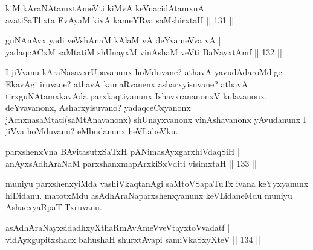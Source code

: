 \begin{shl}
\footnotemark{}kiM kAraNAtamxtAmeVti \footnotemark{}kiMvA keVnacidAtamxnA |\\
avatiSaThxta EvAyaM kivA\footnotemark{} kameYRva saMshirxtaH \hfill || 131 ||
\end{shl}

\begin{shl}
\footnotemark{}guNAnAvx \footnotemark{}yadi veVshAnaM \footnotemark{}kAlaM vA \footnotemark{}deYvameVva vA |\\
\footnotemark{}yadaqcACxM \footnotemark{}saMtatiM \footnotemark{}shUnayxM \footnotemark{}vinAshaM veVti BaNayxtAmf \hfill || 132 ||
\end{shl}

\begin{artha}
I jiVvanu kAraNasavxrUpavanunx hoMduvane? athavA yavudAdaroMdige EkavAgi iruvane? athavA kamaRvanenx asharxyisuvane? athavA tirxguNAtamxkavAda parxkaqtiyanunx IshavxrananonxV kulavanonx, deYvavanonx, Asharxyisuvano? yadaqceCxyanonx jAcnxnasaMtati(saMtAnavanonx) shUnayxvanonx vinAshavanonx yAvudanunx I jiVva hoMduvanu? eMbudanunx heVLabeVku.
\end{artha}


\begin{shl}
parxshenxVna BAvitasutxSaTxH pANimasAyxgarxhiVdaqSiH |\\
anAyxsAdhAraNaM parxshanxmapArxkiSxVditi visimxtaH \hfill || 133 ||
\end{shl}

\begin{artha}
muniyu parxshenxyiMda vashiVkaqtanAgi saMtoVSapaTuTx ivana keYyxyanunx hiDidanu. matotxMdu asAdhAraNaparxshenxyanunx keVLidaneMdu muniyu AshacxyaRpaTiTxruvanu.
\end{artha}

\begin{shl}
asAdhAraNayxsidadhxyXthaRmAvAmeVveVtayxtoV\s vadatf |\\
vidAyxgupitxshacx bahushaH shurxtAvapi samiVkaSxyXteV \hfill || 134 ||
\end{shl}

